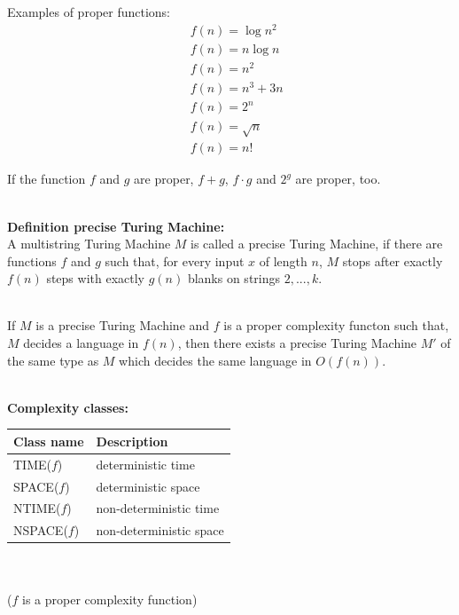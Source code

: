 \documentclass[a4]{scrartcl}
\begin{document}
Examples of proper functions: \cite{book} 
\begin{align*}
\ & f(n) = \log n^2 \\
\ & f(n) = n \log n \\
\ & f(n) = n^2 \\
\ & f(n) = n^3 +3n \\
\ & f(n) = 2^n \\
\ & f(n) = \sqrt{n} \\
\ & f(n) = n!
\end{align*}

If the function $f$ and $g$ are proper, $f+g$, $f \cdot g$ and $2^g$ are proper, too.

\ \\
\textbf{Definition precise Turing Machine:} \cite{book, CC} \\
A multistring Turing Machine $M$ is called a precise Turing Machine, if there are functions $f$ and $g$ such that, for every input $x$ of length $n$, $M$ stops after exactly $f(n)$ steps with exactly $g(n)$ blanks on strings $2, . . . , k$.

\ \\
If $M$ is a precise Turing Machine and $f$ is a proper complexity functon such that, $M$ decides a language in $f(n)$, then there exists a precise Turing Machine $M'$ of the same type as $M$ which decides the same language in $O(f(n))$.


\ \\
\textbf{Complexity classes:} \cite{book, CC} \\

\begin{tabular}{l|l}
Class name & Description \\
\hline
TIME($f$) & deterministic time \\
SPACE($f$) & deterministic space \\
NTIME($f$) & non-deterministic time \\
NSPACE($f$) & non-deterministic space \\
\end{tabular}
\ \\ \\
($f$ is a proper complexity function) 
\end{document}
